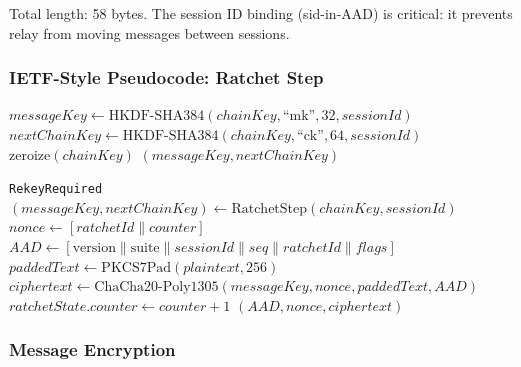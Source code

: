 \documentclass[11pt,a4paper,oneside]{article}
\begin{document}
Total length: 58 bytes. The session ID binding (sid-in-AAD) is critical: it prevents relay from moving messages between sessions.

\subsubsection{IETF-Style Pseudocode: Ratchet Step}

\vspace{0.3cm}
\begin{algorithm}[H]
\caption{RatchetStep(chainKey, sessionId)}
\begin{algorithmic}[1]
\State $messageKey \gets \text{HKDF-SHA384}(chainKey, \text{``mk''}, 32, sessionId)$
\State $nextChainKey \gets \text{HKDF-SHA384}(chainKey, \text{``ck''}, 64, sessionId)$
\State $\text{zeroize}(chainKey)$
\State \Return $(messageKey, nextChainKey)$
\end{algorithmic}
\end{algorithm}

\begin{algorithm}[H]
\caption{EncryptMessage(plaintext, chainKey, ratchetState, sessionId)}
\begin{algorithmic}[1]
  \State \Return \texttt{RekeyRequired}
\EndIf
\State $(messageKey, nextChainKey) \gets \text{RatchetStep}(chainKey, sessionId)$
\State $nonce \gets [ratchetId \| counter]$
\State $AAD \gets [\text{version} \| \text{suite} \| sessionId \| seq \| ratchetId \| flags]$
\State $paddedText \gets \text{PKCS7Pad}(plaintext, 256)$
\State $ciphertext \gets \text{ChaCha20-Poly1305}(messageKey, nonce, paddedText, AAD)$
\State $ratchetState.counter \gets counter + 1$
\State \Return $(AAD, nonce, ciphertext)$
\end{algorithmic}
\end{algorithm}

\subsubsection{Message Encryption}
\end{document}
